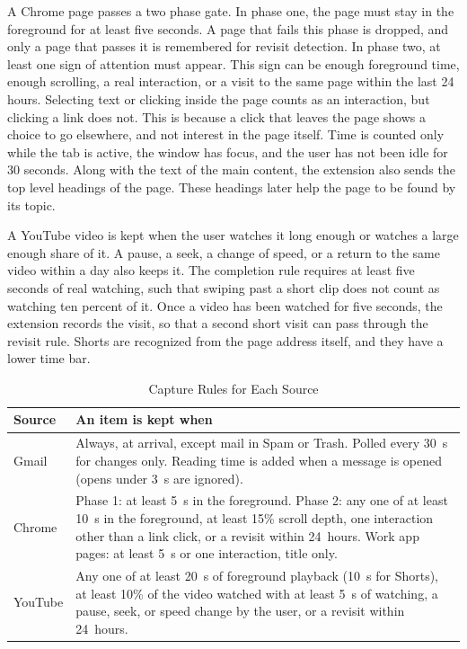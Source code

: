\documentclass[conference]{IEEEtran}
\begin{document}
A Chrome page passes a two phase gate. In phase one, the page must stay in the foreground for at least five seconds. A page that fails this phase is dropped, and only a page that passes it is remembered for revisit detection. In phase two, at least one sign of attention must appear. This sign can be enough foreground time, enough scrolling, a real interaction, or a visit to the same page within the last 24 hours. Selecting text or clicking inside the page counts as an interaction, but clicking a link does not. This is because a click that leaves the page shows a choice to go elsewhere, and not interest in the page itself. Time is counted only while the tab is active, the window has focus, and the user has not been idle for 30 seconds. Along with the text of the main content, the extension also sends the top level headings of the page. These headings later help the page to be found by its topic.

A YouTube video is kept when the user watches it long enough or watches a large enough share of it. A pause, a seek, a change of speed, or a return to the same video within a day also keeps it. The completion rule requires at least five seconds of real watching, such that swiping past a short clip does not count as watching ten percent of it. Once a video has been watched for five seconds, the extension records the visit, so that a second short visit can pass through the revisit rule. Shorts are recognized from the page address itself, and they have a lower time bar.

\begin{table}[t]
\caption{Capture Rules for Each Source}
\label{tab:gates}
\centering
\renewcommand{\arraystretch}{1.15}
\begin{tabular}{|>{\raggedright\arraybackslash}p{1.35cm}|>{\raggedright\arraybackslash}p{6.2cm}|}
\hline
\textbf{Source} & \textbf{An item is kept when} \\
\hline
Gmail & Always, at arrival, except mail in Spam or Trash. Polled every 30~s for changes only. Reading time is added when a message is opened (opens under 3~s are ignored). \\
\hline
Chrome & Phase 1: at least 5~s in the foreground. Phase 2: any one of at least 10~s in the foreground, at least 15\% scroll depth, one interaction other than a link click, or a revisit within 24~hours. Work app pages: at least 5~s or one interaction, title only. \\
\hline
YouTube & Any one of at least 20~s of foreground playback (10~s for Shorts), at least 10\% of the video watched with at least 5~s of watching, a pause, seek, or speed change by the user, or a revisit within 24~hours. \\
\hline
\end{tabular}
\end{table}
\end{document}
